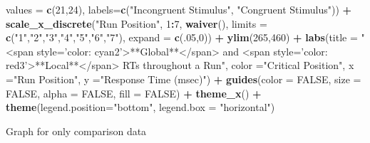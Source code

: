 \documentclass[
]{article}
\newenvironment{Shaded}{\begin{snugshade}}{\end{snugshade}}
\newcommand{\DataTypeTok}[1]{\textcolor[rgb]{0.13,0.29,0.53}{#1}}
\newcommand{\DecValTok}[1]{\textcolor[rgb]{0.00,0.00,0.81}{#1}}
\newcommand{\KeywordTok}[1]{\textcolor[rgb]{0.13,0.29,0.53}{\textbf{#1}}}
\newcommand{\NormalTok}[1]{#1}
\newcommand{\OperatorTok}[1]{\textcolor[rgb]{0.81,0.36,0.00}{\textbf{#1}}}
\newcommand{\OtherTok}[1]{\textcolor[rgb]{0.56,0.35,0.01}{#1}}
\newcommand{\StringTok}[1]{\textcolor[rgb]{0.31,0.60,0.02}{#1}}
\begin{document}
\begin{Shaded}
\begin{Highlighting}[]
                     \DataTypeTok{values =} \KeywordTok{c}\NormalTok{(}\DecValTok{21}\NormalTok{,}\DecValTok{24}\NormalTok{), }
                     \DataTypeTok{labels=}\KeywordTok{c}\NormalTok{(}\StringTok{"Incongruent Stimulus"}\NormalTok{,}
                              \StringTok{"Congruent Stimulus"}\NormalTok{)) }\OperatorTok{+}
\StringTok{  }\KeywordTok{scale_x_discrete}\NormalTok{(}\StringTok{"Run Position"}\NormalTok{, }
                   \DecValTok{1}\OperatorTok{:}\DecValTok{7}\NormalTok{,  }
                   \KeywordTok{waiver}\NormalTok{(),}
                   \DataTypeTok{limits =} \KeywordTok{c}\NormalTok{(}\StringTok{"1"}\NormalTok{,}\StringTok{"2"}\NormalTok{,}\StringTok{"3"}\NormalTok{,}\StringTok{"4"}\NormalTok{,}\StringTok{"5"}\NormalTok{,}\StringTok{"6"}\NormalTok{,}\StringTok{"7"}\NormalTok{),}
                   \DataTypeTok{expand =} \KeywordTok{c}\NormalTok{(.}\DecValTok{05}\NormalTok{,}\DecValTok{0}\NormalTok{)) }\OperatorTok{+}\StringTok{ }
\StringTok{  }\KeywordTok{ylim}\NormalTok{(}\DecValTok{265}\NormalTok{,}\DecValTok{460}\NormalTok{) }\OperatorTok{+}
\StringTok{  }\KeywordTok{labs}\NormalTok{(}\DataTypeTok{title =} \StringTok{"<span style='color: cyan2'>**Global**</span> and <span style='color: red3'>**Local**</span> RTs throughout a Run"}\NormalTok{, }
       \DataTypeTok{color =}\StringTok{"Critical Position"}\NormalTok{, }
       \DataTypeTok{x =}\StringTok{"Run Position"}\NormalTok{, }
       \DataTypeTok{y =}\StringTok{"Response Time (msec)"}\NormalTok{) }\OperatorTok{+}
\StringTok{  }\KeywordTok{guides}\NormalTok{(}\DataTypeTok{color =} \OtherTok{FALSE}\NormalTok{, }\DataTypeTok{size =} \OtherTok{FALSE}\NormalTok{, }\DataTypeTok{alpha =} \OtherTok{FALSE}\NormalTok{, }\DataTypeTok{fill =} \OtherTok{FALSE}\NormalTok{) }\OperatorTok{+}
\StringTok{  }\KeywordTok{theme_x}\NormalTok{() }\OperatorTok{+}
\StringTok{  }\KeywordTok{theme}\NormalTok{(}\DataTypeTok{legend.position=}\StringTok{"bottom"}\NormalTok{, }\DataTypeTok{legend.box =} \StringTok{"horizontal"}\NormalTok{)}
\end{Highlighting}
\end{Shaded}

Graph for only comparison data
\end{document}
